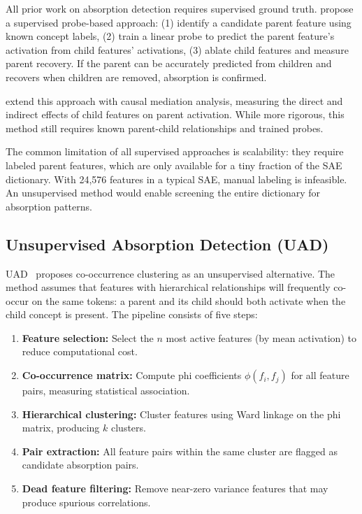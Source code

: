 \documentclass{article}
\begin{document}
All prior work on absorption detection requires supervised ground truth. \citet{chanin2024absorption} propose a supervised probe-based approach: (1) identify a candidate parent feature using known concept labels, (2) train a linear probe to predict the parent feature's activation from child features' activations, (3) ablate child features and measure parent recovery. If the parent can be accurately predicted from children and recovers when children are removed, absorption is confirmed.

\citet{karvonen2025causal} extend this approach with causal mediation analysis, measuring the direct and indirect effects of child features on parent activation. While more rigorous, this method still requires known parent-child relationships and trained probes.

The common limitation of all supervised approaches is scalability: they require labeled parent features, which are only available for a tiny fraction of the SAE dictionary. With 24,576 features in a typical SAE, manual labeling is infeasible. An unsupervised method would enable screening the entire dictionary for absorption patterns.

\subsection{Unsupervised Absorption Detection (UAD)}

UAD~\citep{chanin2024absorption} proposes co-occurrence clustering as an unsupervised alternative. The method assumes that features with hierarchical relationships will frequently co-occur on the same tokens: a parent and its child should both activate when the child concept is present. The pipeline consists of five steps:
\begin{enumerate}
\item \textbf{Feature selection:} Select the $n$ most active features (by mean activation) to reduce computational cost.
\item \textbf{Co-occurrence matrix:} Compute phi coefficients $\phi(f_i, f_j)$ for all feature pairs, measuring statistical association.
\item \textbf{Hierarchical clustering:} Cluster features using Ward linkage on the phi matrix, producing $k$ clusters.
\item \textbf{Pair extraction:} All feature pairs within the same cluster are flagged as candidate absorption pairs.
\item \textbf{Dead feature filtering:} Remove near-zero variance features that may produce spurious correlations.
\end{enumerate}
\end{document}
